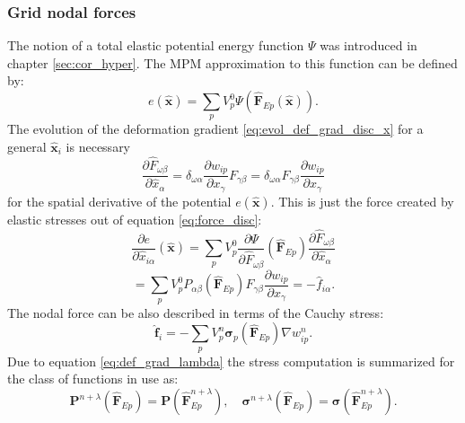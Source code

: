 \documentclass[m,times]{cgMA}
\begin{document}
\subsubsection{Grid nodal forces}
The notion of a total elastic potential energy function $\Psi$ was introduced in chapter \ref{sec:cor_hyper}. The MPM approximation to this function can be defined by:
\begin{equation}\label{eq:energy_discr}
  e(\hat{\boldsymbol{x}}) = \sum_pV^0_p \Psi(\hat{\boldsymbol{F}}_{Ep}(\hat{\boldsymbol{x}})).
\end{equation}
The evolution of the deformation gradient \ref{eq:evol_def_grad_disc_x} for a general $\boldsymbol{\hat{x}}_i$ is necessary
\begin{equation}\label{eq:partial_def_grad}
\frac{\partial \hat{F}_{\omega\beta}}{\partial \hat{x}_\alpha}
= \delta_{\omega \alpha}
\frac{\partial w_{ip}}{\partial x_\gamma}F_{\gamma\beta} = \delta_{\omega \alpha}F_{\gamma\beta} \frac{\partial{w_{ip}}}{\partial x_\gamma}
\end{equation}
for the spatial derivative of the potential $e(\boldsymbol{\hat{x}})$. This is just the force created by elastic stresses out of equation \ref{eq:force_disc}:
$$
  \frac{\partial e}{\partial \hat{x}_{i\alpha}}(\hat{\boldsymbol{x}})
  = \sum_p V^0_p \frac{\partial \Psi}{\partial \hat{F}_{\omega\beta}}(\hat{\boldsymbol{F}}_{Ep})\frac{\partial \hat{F}_{\omega\beta}}{\partial \hat{x}_\alpha}
  $$
  \begin{equation}\label{eq:nodal_force}
  = \sum_p V^0_p P_{\alpha\beta}(\hat{\boldsymbol{F}}_{Ep})F_{\gamma\beta}\frac{\partial w_{ip}}{\partial x_\gamma} = -\hat{f}_{i\alpha}.
\end{equation}
The nodal force can be also described in terms of the Cauchy stress:
\begin{equation}
  \boldsymbol{\hat{f}}_i = - \sum_p V^n_p \boldsymbol{\sigma}_p(\boldsymbol{\hat{F}}_{Ep})\nabla{w^n_{ip}}.
 \end{equation}
Due to equation \ref{eq:def_grad_lambda} the stress computation is summarized for the class of functions in use as:
\begin{equation}
  \boldsymbol{P}^{n+\lambda}(\hat{\boldsymbol{F}}_{Ep}) = \boldsymbol{P}(\hat{\boldsymbol{F}}^{n+\lambda}_{Ep}),
  \quad
  \boldsymbol{\sigma}^{n+\lambda}(\hat{\boldsymbol{F}}_{Ep}) = \boldsymbol{\sigma}(\hat{\boldsymbol{F}}^{n+\lambda}_{Ep}).
\end{equation}
\begin{flushright}\cite{MPM:COURSE}\cite{MPM:APIC}\end{flushright}
\end{document}
